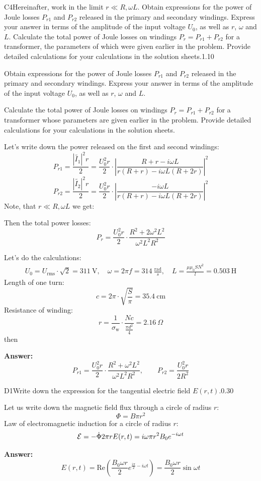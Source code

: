 \documentclass[11pt,a4paper]{article}
\begin{document}
\begin{solcard}{C4}{Hereinafter, work in the limit $r\ll R, \omega L$. Obtain expressions for the power of Joule losses $P_{r1}$ and $P_{r2}$ released in the primary and secondary windings. Express your answer in terms of the amplitude of the input voltage $U_0$, as well as $r$, $\omega$ and $L$. Calculate the total power of Joule losses on windings $P_{r} =P_{r1} + P_{r2}$ for a transformer, the parameters of which were given earlier in the problem. Provide detailed calculations for your calculations in the solution sheets.}{1.10}

Obtain expressions for the power of Joule losses $P_{r1}$ and $P_{r2}$ released in the primary and secondary windings. Express your answer in terms of the amplitude of the input voltage $U_0$, as well as $r$, $\omega$ and $L$.


Calculate the total power of Joule losses on windings $P_{r} =P_{r1} + P_{r2}$ for a transformer whose parameters are given earlier in the problem. Provide detailed calculations for your calculations in the solution sheets.


Let's write down the power released on the first and second windings: $$ P_{r1}=\frac{|\tilde{I_1}|^2r}{2}=\frac{U_0^2r}{2}\cdot \left| \frac{R+r-i \omega L}{r(R+r)-i \omega L(R+2 r)}\right|^2 $$$$ P_{r2}=\frac{|\tilde{I_2}|^2r}{2}=\frac{U_0^2r}{2}\cdot \left| \frac{-i \omega L}{r(R+r)-i \omega L(R+2 r)}\right|^2 $$Note, that $r \ll R, \omega L$ we get:


Then the total power losses: $$ P_r = \frac{U_0^2r}{2}\cdot\frac{R^2+2\omega^2 L^2}{\omega^2L^2R^2} $$


Let's do the calculations:
\[\begin{gathered}
U_0 = U_{\text{rms}}\cdot \sqrt{2}=311~\text{V},\quad \omega = 2\pi f = 314~ \frac{\text{rad}}{s},\quad L=\frac{\mu\mu_0SN^2}{l} = 0.503~ \text{H}
\end{gathered}\]
Length of one turn: \[ c= 2\pi \cdot \sqrt{\frac{S}{\pi}}=35.4 ~\text{cm} \]
Resistance of winding: \[ r = \frac{1}{\sigma_\text{w}}\cdot\frac{Nc}{\frac{\pi d^2}{4}}=2.16~\Omega \] then

\par\smallskip\noindent\textbf{Answer:} $$ P_{r1}=\frac{U_0^2r}{2}\cdot\frac{R^2+\omega^2 L^2}{\omega^2L^2R^2} ,\qquad P_{r2}=\frac{U_0^2r}{2R^2} $$
\end{solcard}

\begin{solcard}{D1}{Write down the expression for the tangential electric field $E(r,t)$.}{0.30}

Let us write down the magnetic field flux through a circle of radius $r$:$$\Phi=B\pi r^2$$Law of electromagnetic induction for a circle of radius $r$:$$\mathcal{E}=-\dot{\Phi}\\ 2\pi r E(r,t)=i\omega\pi r^2B_0 e^{-i\omega t} $$

\par\smallskip\noindent\textbf{Answer:} $$ E(r, t) = \text{Re}\left(\frac{B_0\omega r}{2}e^{\frac{i\pi}{2}-i\omega t}\right)= \frac{B_0\omega r}{2} \sin{\omega t} $$
\end{solcard}
\end{document}

